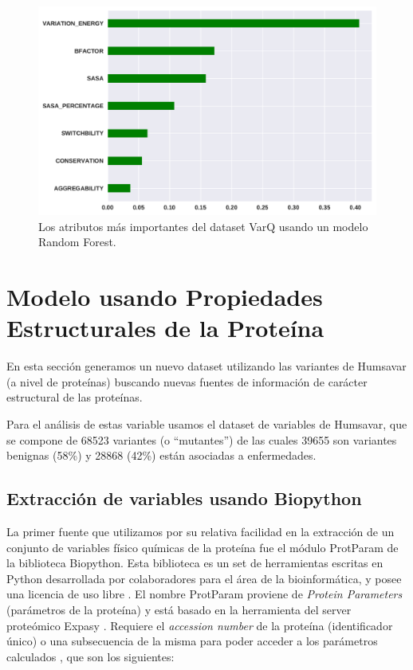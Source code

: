 \begin{figure}[H]
    \centering
    \includegraphics[scale=0.55]{documents/latex/figures/3/importances_varq.pdf}
    \caption{Los atributos más importantes del dataset VarQ usando un modelo Random Forest. }
    \label{fig:importance_varq}
\end{figure}

\section{Modelo usando Propiedades Estructurales de la Proteína}

En esta sección generamos un nuevo dataset utilizando las variantes de Humsavar (a nivel de proteínas) buscando nuevas fuentes de información de carácter estructural de las proteínas.

Para el análisis de estas variable usamos el dataset de variables de Humsavar, que se compone de 68523 variantes (o ``mutantes'') de las cuales 39655 son variantes benignas (58\%) y 28868 (42\%) están asociadas a enfermedades. 

\subsection{Extracción de variables usando Biopython}

La primer fuente que utilizamos por su relativa facilidad en la extracción de un conjunto de variables físico químicas de la proteína fue el módulo ProtParam de la biblioteca Biopython. Esta biblioteca es un set de herramientas escritas en Python desarrollada por colaboradores para el área de la bioinformática, y posee una licencia de uso libre \todo{[citar]}.
El nombre ProtParam proviene de \textit{Protein Parameters} (parámetros de la proteína) y está basado en la herramienta del server proteómico Expasy \todo{[citar]}. Requiere el \textit{accession number} de la proteína (identificador único) o una subsecuencia de la misma para poder acceder a los parámetros calculados \todo{[citar]}, que son los siguientes:

